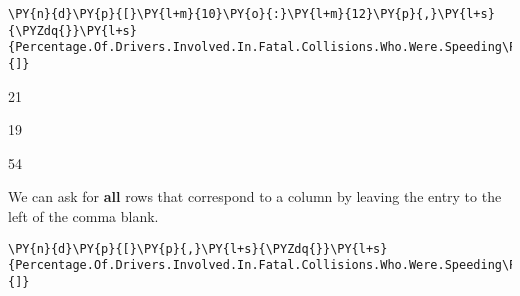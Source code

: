     \begin{tcolorbox}[breakable, size=fbox, boxrule=1pt, pad at break*=1mm,colback=cellbackground, colframe=cellborder]
\begin{Verbatim}[commandchars=\\\{\}]
\PY{n}{d}\PY{p}{[}\PY{l+m}{10}\PY{o}{:}\PY{l+m}{12}\PY{p}{,}\PY{l+s}{\PYZdq{}}\PY{l+s}{Percentage.Of.Drivers.Involved.In.Fatal.Collisions.Who.Were.Speeding\PYZdq{}}\PY{p}{]}
\end{Verbatim}
\end{tcolorbox}

    \begin{enumerate*}
\item 21
\item 19
\item 54
\end{enumerate*}


    
    We can ask for \textbf{all} rows that correspond to a column by leaving
the entry to the left of the comma blank.

    \begin{tcolorbox}[breakable, size=fbox, boxrule=1pt, pad at break*=1mm,colback=cellbackground, colframe=cellborder]
\begin{Verbatim}[commandchars=\\\{\}]
\PY{n}{d}\PY{p}{[}\PY{p}{,}\PY{l+s}{\PYZdq{}}\PY{l+s}{Percentage.Of.Drivers.Involved.In.Fatal.Collisions.Who.Were.Speeding\PYZdq{}}\PY{p}{]}
\end{Verbatim}
\end{tcolorbox}

